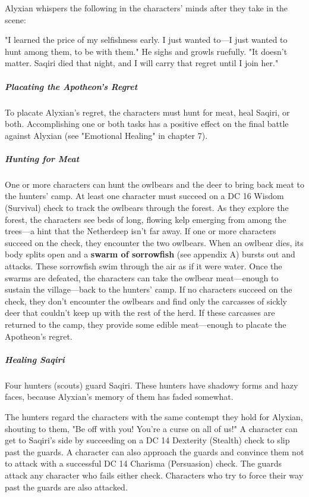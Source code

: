 \documentclass[10pt,a4paper,twoside,fancy,bg=print,twocolumn,openany,nodeprecatedcode]{dndbook}
\begin{document}
Alyxian whispers the following in the characters' minds after they take in the scene:

\begin{DndReadAloud}{}
"I learned the price of my selfishness early. I just wanted to—I just wanted to hunt among them, to be with them." He sighs and growls ruefully. "It doesn't matter. Saqiri died that night, and I will carry that regret until I join her."

\end{DndReadAloud}

\subparagraph{Placating the Apotheon's Regret}
To placate Alyxian's regret, the characters must hunt for meat, heal Saqiri, or both. Accomplishing one or both tasks has a positive effect on the final battle against Alyxian (see "Emotional Healing" in chapter 7).

\subparagraph{Hunting for Meat}
One or more characters can hunt the owlbears and the deer to bring back meat to the hunters' camp. At least one character must succeed on a DC 16 Wisdom (Survival) check to track the owlbears through the forest. As they explore the forest, the characters see beds of long, flowing kelp emerging from among the trees—a hint that the Netherdeep isn't far away. If one or more characters succeed on the check, they encounter the two owlbears. When an owlbear dies, its body splits open and a \textbf{swarm of sorrowfish} (see appendix A) bursts out and attacks. These sorrowfish swim through the air as if it were water. Once the swarms are defeated, the characters can take the owlbear meat—enough to sustain the village—back to the hunters' camp. If no characters succeed on the check, they don't encounter the owlbears and find only the carcasses of sickly deer that couldn't keep up with the rest of the herd. If these carcasses are returned to the camp, they provide some edible meat—enough to placate the Apotheon's regret.

\subparagraph{Healing Saqiri}
Four hunters (scouts) guard Saqiri. These hunters have shadowy forms and hazy faces, because Alyxian's memory of them has faded somewhat.

The hunters regard the characters with the same contempt they hold for Alyxian, shouting to them, "Be off with you! You're a curse on all of us!" A character can get to Saqiri's side by succeeding on a DC 14 Dexterity (Stealth) check to slip past the guards. A character can also approach the guards and convince them not to attack with a successful DC 14 Charisma (Persuasion) check. The guards attack any character who fails either check. Characters who try to force their way past the guards are also attacked.
\end{document}
